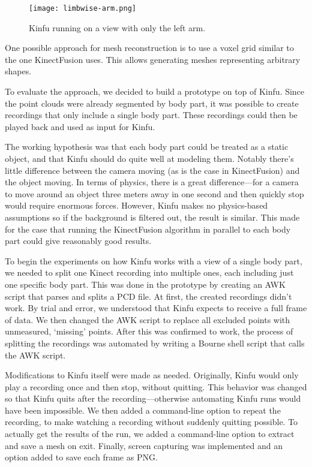 \begin{figure}
    \centering
    \texttt{[image: limbwise-arm.png]}
    \caption{Kinfu running on a view with only the left arm.}
    \label{fig:limbwise-arm}
\end{figure}

One possible approach for mesh reconstruction is to use a voxel grid similar to the one KinectFusion \autocites{newcombe2011kinectfusion}{izadi2011kinectfusion} uses. This allows generating meshes representing arbitrary shapes.

To evaluate the approach, we decided to build a prototype on top of Kinfu. Since the point clouds were already segmented by body part, it was possible to create recordings that only include a single body part. These recordings could then be played back and used as input for Kinfu.

The working hypothesis was that each body part could be treated as a static object, and that Kinfu should do quite well at modeling them. Notably there's little difference between the camera moving (as is the case in KinectFusion) and the object moving. In terms of physics, there is a great difference---for a camera to move around an object three meters away in one second and then quickly stop would require enormous forces. However, Kinfu makes no physics-based assumptions so if the background is filtered out, the result is similar. This made for the case that running the KinectFusion algorithm in parallel to each body part could give reasonably good results.

To begin the experiments on how Kinfu works with a view of a single body part, we needed to split one Kinect recording into multiple ones, each including just one specific body part. This was done in the prototype by creating an AWK script that parses and splits a PCD file. At first, the created recordings didn't work. By trial and error, we understood that Kinfu expects to receive a full frame of data. We then changed the AWK script to replace all excluded points with unmeasured, `missing' points. After this was confirmed to work, the process of splitting the recordings was automated by writing a Bourne shell script that calls the AWK script.

Modifications to Kinfu itself were made as needed. Originally, Kinfu would only play a recording once and then stop, without quitting. This behavior was changed so that Kinfu quits after the recording---otherwise automating Kinfu runs would have been impossible. We then added a command-line option to repeat the recording, to make watching a recording without suddenly quitting possible. To actually get the results of the run, we added a command-line option to extract and save a mesh on exit. Finally, screen capturing was implemented and an option added to save each frame as PNG.

